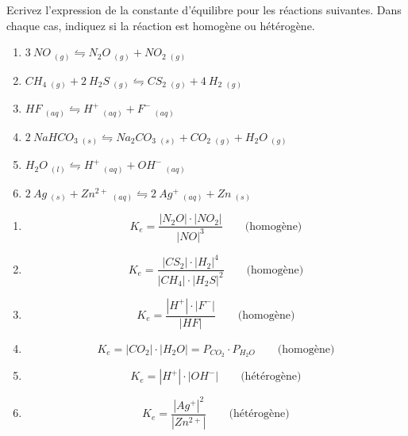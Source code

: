\documentclass[
  11pt,
  a4paper,
  openany]{book}
\providecommand{\tightlist}{%
  \setlength{\itemsep}{0pt}\setlength{\parskip}{0pt}}
\begin{document}
\begin{Exercise}

Ecrivez l'expression de la constante d'équilibre pour les réactions suivantes. Dans chaque cas, indiquez si la réaction est homogène ou hétérogène.

\begin{enumerate}
\def\labelenumi{\arabic{enumi}.}
\tightlist
\item
  \(3\ NO\ _{(g)} \leftrightharpoons N_2O\ _{(g)} + NO_2\ _{(g)}\)
\item
  \(CH_4\ _{(g)} + 2\ H_2S\ _{(g)} \leftrightharpoons CS_2\ _{(g)} + 4\ H_2\ _{(g)}\)
\item
  \(HF\ _{(aq)} \leftrightharpoons H^+\ _{(aq)} + F^-\ _{(aq)}\)
\item
  \(2\ NaHCO_3\ _{(s)} \leftrightharpoons Na_2CO_3\ _{(s)} + CO_2\ _{(g)} + H_2O\ _{(g)}\)
\item
  \(H_2O\ _{(l)} \leftrightharpoons H^+\ _{(aq)} + OH^-\ _{(aq)}\)
\item
  \(2\ Ag\ _{(s)} + Zn^{2+}\ _{(aq)} \leftrightharpoons 2\ Ag^+\ _{(aq)} + Zn\ _{(s)}\)
\end{enumerate}

\end{Exercise}

\begin{Answer}

\begin{enumerate}
\def\labelenumi{\arabic{enumi}.}
\tightlist
\item
  \[ K_{e} = \frac{|N_2O| \cdot |NO_2|}{|NO|^{3}} \qquad \text{(homogène)} \]
\item
  \[ K_{e} = \frac{|CS_2| \cdot |H_2|^{4}}{|CH_4| \cdot |H_2S|^{2}} \qquad \text{(homogène)} \]
\item
  \[ K_{e} = \frac{|H^+| \cdot |F^-|}{|HF|} \qquad \text{(homogène)} \]
\item
  \[ K_{e} = |CO_2| \cdot |H_2O| = P_{CO_2} \cdot P_{H_2O} \qquad \text{(homogène)} \]
\item
  \[ K_{e} = |H^+| \cdot |OH^-| \qquad \text{(hétérogène)} \]
\item
  \[ K_{e} = \frac{|Ag^+|^{2}}{|Zn^{2+}|} \qquad \text{(hétérogène)} \]
\end{enumerate}

\clearpage

\end{Answer}
\end{document}

